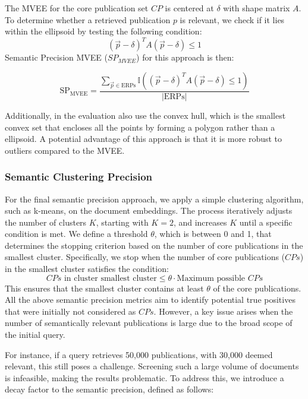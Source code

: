 The MVEE for the core publication set $CP$ is centered at $\delta$ with shape matrix $A$. To determine whether a retrieved publication $p$ is relevant, we check if it lies within the ellipsoid by testing the following condition:
\[
(\vec{p} - \delta)^T A (\vec{p} - \delta) \leq 1
\]
Semantic Precision MVEE ($SP_{MVEE}$) for this approach is then:

\begin{equation}\label{eq:sp-mvee}
	\text{SP}_{\text{MVEE}} = \frac{\sum_{\vec{p} \in \text{ERPs}} \mathbb{I} \left( (\vec{p} - \delta)^T A (\vec{p} - \delta) \leq 1 \right)}{|\text{ERPs}|}
\end{equation}

Additionally, in the evaluation also use the convex hull, which is the smallest convex set that encloses all the points by forming a polygon rather than a ellipsoid. A potential advantage of this approach is that it is more robust to outliers compared to the MVEE.

\subsubsection{Semantic Clustering Precision}

For the final semantic precision approach, we apply a simple clustering algorithm, such as k-means, on the document embeddings. The process iteratively adjusts the number of clusters \( K \), starting with \( K=2 \), and increases \( K \) until a specific condition is met. We define a threshold \( \theta \), which is between 0 and 1, that determines the stopping criterion based on the number of core publications in the smallest cluster. Specifically, we stop when the number of core publications (\( CPs \)) in the smallest cluster satisfies the condition:
\begin{equation}
CPs \text{ in cluster smallest cluster} \leq \theta \cdot \text{Maximum possible } CPs
 \end{equation}\label{eq:sp-clustering}
This ensures that the smallest cluster contains at least \( \theta \) of the core publications.
All the above semantic precision metrics aim to identify potential true positives that were initially not considered as \( CPs \). However, a key issue arises when the number of semantically relevant publications is large due to the broad scope of the initial query. 

For instance, if a query retrieves 50,000 publications, with 30,000 deemed relevant, this still poses a challenge. Screening such a large volume of documents is infeasible, making the results problematic. To address this, we introduce a decay factor to the semantic precision, defined as follows:

